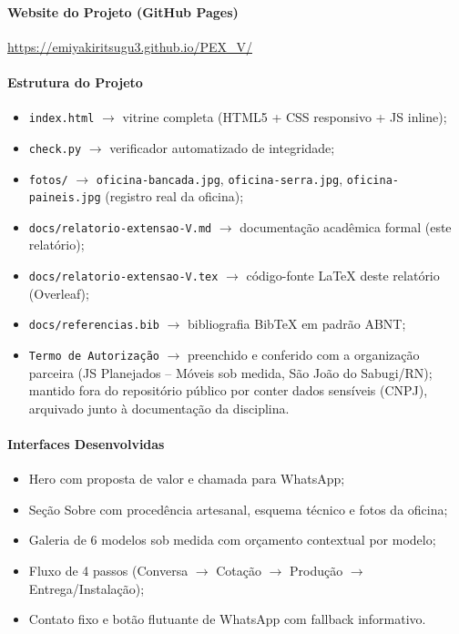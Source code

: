 \documentclass[12pt,a4paper]{article}
\begin{document}
\paragraph{Website do Projeto (GitHub Pages)}
\url{https://emiyakiritsugu3.github.io/PEX_V/}

\paragraph{Estrutura do Projeto}
\begin{itemize}[leftmargin=*]
\item \texttt{index.html} $\to$ vitrine completa (HTML5 + CSS responsivo + JS inline);
\item \texttt{check.py} $\to$ verificador automatizado de integridade;
\item \texttt{fotos/} $\to$ \texttt{oficina-bancada.jpg}, \texttt{oficina-serra.jpg}, \texttt{oficina-paineis.jpg} (registro real da oficina);
\item \texttt{docs/relatorio-extensao-V.md} $\to$ documentação acadêmica formal (este relatório);
\item \texttt{docs/relatorio-extensao-V.tex} $\to$ código-fonte LaTeX deste relatório (Overleaf);
\item \texttt{docs/referencias.bib} $\to$ bibliografia BibTeX em padrão ABNT;
\item \texttt{Termo de Autorização} $\to$ preenchido e conferido com a organização parceira (JS Planejados -- Móveis sob medida, São João do Sabugi/RN); mantido fora do repositório público por conter dados sensíveis (CNPJ), arquivado junto à documentação da disciplina.
\end{itemize}

\paragraph{Interfaces Desenvolvidas}
\begin{itemize}[leftmargin=*]
\item Hero com proposta de valor e chamada para WhatsApp;
\item Seção Sobre com procedência artesanal, esquema técnico e fotos da oficina;
\item Galeria de 6 modelos sob medida com orçamento contextual por modelo;
\item Fluxo de 4 passos (Conversa $\to$ Cotação $\to$ Produção $\to$ Entrega/Instalação);
\item Contato fixo e botão flutuante de WhatsApp com fallback informativo.
\end{itemize}
\end{document}
